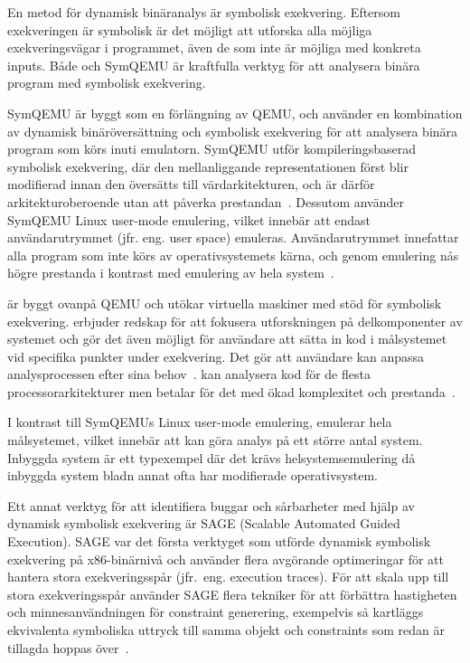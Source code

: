 En metod för dynamisk binäranalys är symbolisk exekvering. Eftersom exekveringen är symbolisk är
det möjligt att utforska alla möjliga exekveringsvägar i programmet, även de som inte är möjliga
med konkreta inputs. Både \stoe{} och SymQEMU är kraftfulla verktyg för att analysera binära program
med symbolisk exekvering.

SymQEMU är byggt som en förlängning av QEMU, och använder en kombination av
dynamisk binäröversättning och symbolisk exekvering för att analysera binära
program som körs inuti emulatorn. SymQEMU utför kompileringsbaserad symbolisk
exekvering, där den mellanliggande representationen först blir modifierad innan
den översätts till värdarkitekturen, och är därför arkitekturoberoende utan att
påverka prestandan~\cite{symqemu}. Dessutom använder SymQEMU Linux user-mode
emulering, vilket innebär att endast användarutrymmet (jfr. eng. user space)
emuleras. Användarutrymmet innefattar alla program som inte körs av
operativsystemets kärna, och genom emulering nås högre prestanda i kontrast med
emulering av hela system~\cite{symqemu}.

\stoe{} är byggt ovanpå QEMU och utökar virtuella maskiner med stöd för
symbolisk exekvering. \stoe{} erbjuder redskap för att fokusera utforskningen på
delkomponenter av systemet och gör det även möjligt för användare att sätta in
kod i målsystemet vid specifika punkter under exekvering. Det gör att användare
kan anpassa analysprocessen efter sina behov~\cite{s2e}. \stoe{} kan analysera
kod för de flesta processorarkitekturer men betalar för det med ökad komplexitet
och prestanda~\cite{symqemu}. 

I kontrast till SymQEMUs Linux user-mode emulering, emulerar \stoe{} hela
målsystemet, vilket innebär att \stoe{} kan göra analys på ett större antal
system. Inbyggda system är ett typexempel där det krävs helsystemsemulering då
inbyggda system bladn annat ofta har modifierade operativsystem.

Ett annat verktyg för att identifiera buggar och sårbarheter med hjälp av dynamisk symbolisk
exekvering är SAGE (Scalable Automated Guided Execution).
SAGE var det första verktyget som utförde dynamisk symbolisk exekvering på x86-binärnivå och använder flera
avgörande optimeringar för att hantera stora exekveringsspår (jfr.\ eng. execution traces).
För att skala upp till stora exekveringsspår använder SAGE flera tekniker för att förbättra hastigheten och
minnesanvändningen för constraint generering, exempelvis så kartläggs ekvivalenta symboliska uttryck till samma
objekt och constraints som redan är tillagda hoppas över~\cite{sage}.

